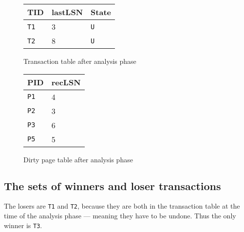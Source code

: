 \begin{multicols}{2}
\begin{figure}[H]
    \centering
    \begin{tabular}{|l|l|l|}
        \hline
        {\bf TID} & {\bf lastLSN} & {\bf State} \\ \hline
        {\tt T1} & 3 & {\tt U} \\ \hline
        {\tt T2} & 8 & {\tt U} \\ \hline
    \end{tabular}
    \label{table:anal-phase-tt} %
    \caption{Transaction table after analysis phase}
\end{figure}

\colbreak

\begin{figure}[H]
    \centering
    \begin{tabular}{|l|l|}
        \hline
        {\bf PID} & {\bf recLSN} \\ \hline
        {\tt P1} & 4 \\ \hline
        {\tt P2} & 3 \\ \hline
        {\tt P3} & 6 \\ \hline
        {\tt P5} & 5 \\ \hline
    \end{tabular}
    \label{table:anal-phase-dpt} %
    \caption{Dirty page table after analysis phase}
\end{figure}

\end{multicols}

\iffalse
Following the above the transaction table includes
\begin{itemize}
\item {\tt T1} with status {\tt U} and LAST\_LSN equal to 3.
\item {\tt T2} with status {\tt U} and LAST\_LSN equal to 8.
\end{itemize}
and the dirty page table holds
\begin{itemize}
\item {\tt P1} with recLSN equal to 4.
\item {\tt P2} with recLSN equal to 3.
\item {\tt P3} with recLSN equal to 6.
\item {\tt P5} with recLSN equal to 5.
\end{itemize}
\fi

\subsection{The sets of winners and loser transactions}
The losers are {\tt T1} and {\tt T2}, because they are both in the transaction
table at the time of the analysis phase --- meaning they have to be undone.
Thus the only winner is {\tt T3}.

